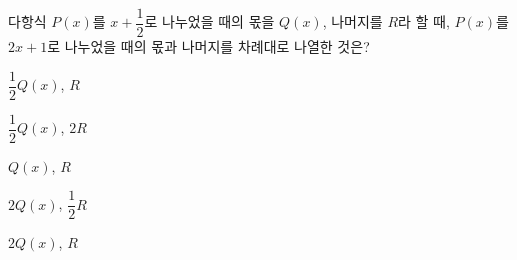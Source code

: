 다항식 $P(x)$를 $x+\dfrac{1}{2}$로 나누었을 때의 몫을 $Q(x)$, 나머지를 $R$라 할 때, $P(x)$를 $2x+1$로 나누었을 때의 몫과 나머지를 차례대로 나열한 것은?
\begin{choicesii}{\rule[-3ex]{0pt}{8ex}$\dfrac{1}{2}Q(x)$, $R$}{\rule[-3ex]{0pt}{8ex}$\dfrac{1}{2}Q(x)$, $2R$}{\rule[-3ex]{0pt}{8ex}$Q(x)$, $R$}{\rule[-3ex]{0pt}{8ex}$2Q(x)$, $\dfrac{1}{2}R$}{\rule[-3ex]{0pt}{8ex}$2Q(x)$, $R$}\end{choicesii}
